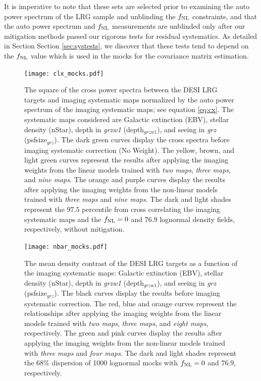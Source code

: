 It is imperative to note that these sets are selected prior to examining the auto power spectrum of the LRG sample and unblinding the $f_{\rm NL}$ constraints, and that the auto power spectrum and $f_{\rm NL}$ measurements are unblinded only after our mitigation methods passed our rigorous tests for residual systematics. As detailed in Section Section \ref{sec:systests}, we discover that these tests tend to depend on the $f_{\rm NL}$ value which is used in the mocks for the covariance matrix estimation.

\begin{figure}
\centering
\texttt{[image: clx\_mocks.pdf]}
\caption{The square of the cross power spectra between the DESI LRG targets and imaging systematic maps normalized by the auto power spectrum of the imaging systematic maps; see equation \ref{eq:cx}. The systematic maps considered are Galactic extinction (EBV), stellar density (nStar), depth in \textit{grzw1} (depth$_{grzw1}$), and seeing in \textit{grz} (psfsize$_{grz}$). The dark green curves display the cross spectra before imaging systematic correction (No Weight). The yellow, brown, and light green curves represent the results after applying the imaging weights from the linear models trained with \textit{two maps}, \textit{three maps}, and \textit{nine maps}. The orange and purple curves display the results after applying the imaging weights from the non-linear models trained with \textit{three maps} and \textit{nine maps}. The dark and light shades represent the $97.5$ percentile from cross correlating the imaging systematic maps and the $f_{\rm NL}=0$ and $76.9$ lognormal density fields, respectively, without mitigation.}\label{fig:clxmock}
\end{figure}

\begin{figure}
\centering
\texttt{[image: nbar\_mocks.pdf]}
\caption{The mean density contrast of the DESI LRG targets as a function of the imaging systematic maps: Galactic extinction (EBV), stellar density (nStar), depth in \textit{grzw1} (depth$_{grzw1}$), and seeing in \textit{grz} (psfsize$_{grz}$). The black curves display the results before imaging systematic correction. The red, blue and orange curves represent the relationships after applying the imaging weights from the linear models trained with \textit{two maps}, \textit{three maps}, and \textit{eight maps}, respectively. The green and pink curves display the results after applying the imaging weights from the non-linear models trained with \textit{three maps} and \textit{four maps}. The dark and light shades represent the $68\%$ dispersion of 1000 lognormal mocks with $f_{\rm NL}=0$ and $76.9$, respectively.}\label{fig:nbarmock}
\end{figure}

